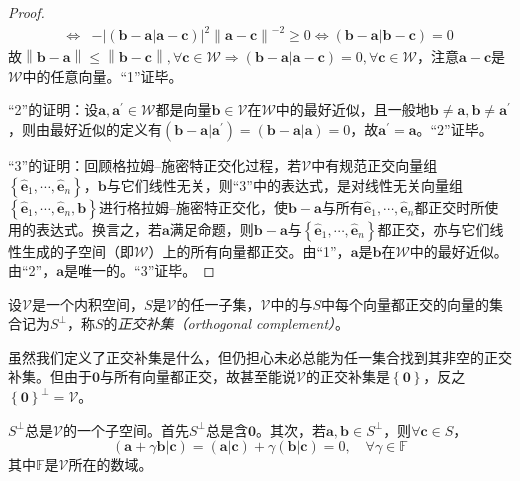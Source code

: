 \documentclass[main.tex]{subfiles}
\begin{document}
\begin{proof}
\begin{align*}
        \Leftrightarrow & -\left|\left(\mathbf{b}-\mathbf{a}|\mathbf{a}-\mathbf{c}\right)\right|^2\left\|\mathbf{a}-\mathbf{c}\right\|^{-2}\geq 0\Leftrightarrow\left(\mathbf{b}-\mathbf{a}|\mathbf{b}-\mathbf{c}\right)=0
    \end{align*}
    故$\left\|\mathbf{b}-\mathbf{a}\right\|\leq\left\|\mathbf{b}-\mathbf{c}\right\|,\forall\mathbf{c}\in\mathcal{W}\Rightarrow\left(\mathbf{b}-\mathbf{a}|\mathbf{a}-\mathbf{c}\right)=0,\forall\mathbf{c}\in\mathcal{W}$，注意$\mathbf{a}-\mathbf{c}$是$\mathcal{W}$中的任意向量。“1”证毕。

    “2”的证明：设$\mathbf{a},\mathbf{a}^\prime\in\mathcal{W}$都是向量$\mathbf{b}\in\mathcal{V}$在$\mathcal{W}$中的最好近似，且一般地$\mathbf{b}\neq\mathbf{a},\mathbf{b}\neq\mathbf{a}^\prime$，则由最好近似的定义有$\left(\mathbf{b}-\mathbf{a}|\mathbf{a}^\prime\right)=\left(\mathbf{b}-\mathbf{a}|\mathbf{a}\right)=0$，故$\mathbf{a}^\prime=\mathbf{a}$。“2”证毕。

    “3”的证明：回顾格拉姆--施密特正交化过程，若$\mathcal{V}$中有规范正交向量组$\left\{\mathbf{\hat{e}}_1,\cdots,\mathbf{\hat{e}}_n\right\}$，$\mathbf{b}$与它们线性无关，则“3”中的表达式，是对线性无关向量组$\left\{\mathbf{\hat{e}}_1,\cdots,\mathbf{\hat{e}}_n,\mathbf{b}\right\}$进行格拉姆--施密特正交化，使$\mathbf{b}-\mathbf{a}$与所有$\mathbf{\hat{e}}_1,\cdots,\mathbf{\hat{e}}_n$都正交时所使用的表达式。换言之，若$\mathbf{a}$满足命题，则$\mathbf{b}-\mathbf{a}$与$\left\{\mathbf{\hat{e}}_1,\cdots,\mathbf{\hat{e}}_n\right\}$都正交，亦与它们线性生成的子空间（即$\mathcal{W}$）上的所有向量都正交。由“1”，$\mathbf{a}$是$\mathbf{b}$在$\mathcal{W}$中的最好近似。由“2”，$\mathbf{a}$是唯一的。“3”证毕。
\end{proof}

\begin{definition}[正交补集]\label{def:A.4}
    设$\mathcal{V}$是一个内积空间，$S$是$\mathcal{V}$的任一子集，$\mathcal{V}$中的与$S$中每个向量都正交的向量的集合记为$S^\perp$，称$S$的\emph{正交补集（orthogonal complement）}。
\end{definition}

虽然我们定义了正交补集是什么，但仍担心未必总能为任一集合找到其非空的正交补集。但由于$\mathbf{0}$与所有向量都正交，故甚至能说$\mathcal{V}$的正交补集是$\left\{\mathbf{0}\right\}$，反之$\left\{\mathbf{0}\right\}^\perp=\mathcal{V}$。

$S^\perp$总是$\mathcal{V}$的一个子空间。首先$S^\perp$总是含$\mathbf{0}$。其次，若$\mathbf{a},\mathbf{b}\in S^\perp$，则$\forall\mathbf{c}\in S$，
\[\left(\mathbf{a}+\gamma\mathbf{b}|\mathbf{c}\right)=\left(\mathbf{a}|\mathbf{c}\right)+\gamma\left(\mathbf{b}|\mathbf{c}\right)=0,\quad\forall\gamma\in\mathbb{F}\]
其中$\mathbb{F}$是$\mathcal{V}$所在的数域。
\end{document}
